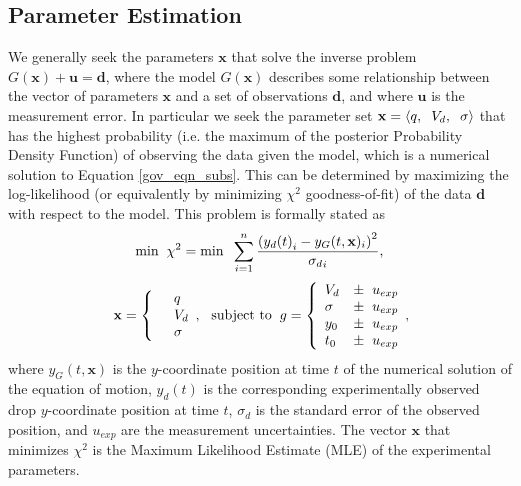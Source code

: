 \documentclass[aip,reprint, floatfix]{revtex4-1}
\begin{document}
\subsection{Parameter Estimation}
We generally seek the parameters $\mathbf{x}$ that solve the inverse problem $G(\mathbf{x}) + \mathbf{u} = \mathbf{d}$, where the model $G(\mathbf{x})$ describes some relationship between the vector of parameters $\mathbf{x}$ and a set of observations $\mathbf{d}$, and where $\mathbf{u}$ is the measurement error. In particular we seek the parameter set $\mathbf{x} = \left\langle q, \hspace{2 mm} V_d, \hspace{2 mm} \sigma \right\rangle$ that has the highest probability (i.e. the maximum of the posterior Probability Density Function) of observing the data given the model, which is a numerical solution to Equation \ref{gov_eqn_subs}. This can be determined by maximizing the log-likelihood (or equivalently by minimizing $\chi^2$ goodness-of-fit) of the data $\mathbf{d}$ with respect to the model. This problem is formally stated as  
\[
\mbox{min} \hspace{2 mm} \chi^2 = \mbox{min} \hspace{2 mm} \sum^n_{i=1} \frac{\left({y_d(t)}_i - y_G(t, \mathbf{x})_i \right)^2}{{\sigma_d}_i},
\]
\begin{eqnarray*} \mbox{} \hspace{2 mm} \begin{split} \mathbf{x} = \left\{ \begin{array}{ll}      & q\\
		  &	V_d\\
          & \sigma 
          \end{array}, \right. 
          \end{split} \hspace{2 mm} \mbox{subject to} \hspace{2 mm} \begin{split}
          g = \left\{ \begin{array}{ll}
           V_d &\pm \hspace{2 mm} u_{exp}\\
      	   \sigma &\pm  \hspace{2 mm} u_{exp}\\
      	   y_0 &\pm \hspace{2 mm} u_{exp}\\
      	   t_0 &\pm \hspace{2 mm} u_{exp}\\
          \end{array}, \right. 
          \end{split}
\end{eqnarray*}
where $y_G(t, \mathbf{x})$ is the $y$-coordinate position at time $t$ of the numerical solution of the equation of motion, $y_d(t)$ is the corresponding experimentally observed drop $y$-coordinate position at time $t$, $\sigma_d$ is the standard error of the observed position, and $u_{exp}$ are the measurement uncertainties. The vector $\mathbf{x}$ that minimizes $\chi^2$ is the Maximum Likelihood Estimate (MLE) of the experimental parameters.
\end{document}

